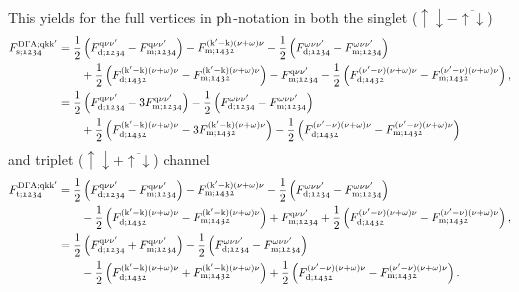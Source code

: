 \documentclass[main.tex]{subfiles}
\begin{document}
This yields for the full vertices in $\text{ph}$-notation in both the singlet ($\uparrow\downarrow-\overline{\uparrow\downarrow}$)
\begin{align}
\begin{split}
	F_{\text{s};\mathfrak{1234}}^{\text{D}\Gamma\text{A};\text{q}\text{k}\text{k}'}&=\frac12\left (F_{\text{d};\mathfrak{1234}}^{\text{q}\nu\nu'}-F_{\text{m};\mathfrak{1234}}^{\text{q}\nu\nu'}\right )-F_{\text{m};\mathfrak{1432}}^{(\text{k}'-\text{k})(\nu+\omega)\nu}-\frac12\left (F_{\text{d};\mathfrak{1234}}^{\omega\nu\nu'}-F_{\text{m};\mathfrak{1234}}^{\omega\nu\nu'}\right )\\
	&\qquad+\frac12\left (F_{\text{d};\mathfrak{1432}}^{(\text{k}'-\text{k})(\nu+\omega)\nu}-F_{\text{m};\mathfrak{1432}}^{(\text{k}'-\text{k})(\nu+\omega)\nu}\right )-F_{\text{m};\mathfrak{1234}}^{\text{q}\nu\nu'}-\frac12\left (F_{\text{d};\mathfrak{1432}}^{(\nu'-\nu)(\nu+\omega)\nu}-F_{\text{m};\mathfrak{1432}}^{(\nu'-\nu)(\nu+\omega)\nu}\right ),\\
	&=\frac12\left (F_{\text{d};\mathfrak{1234}}^{\text{q}\nu\nu'}-3F_{\text{m};\mathfrak{1234}}^{\text{q}\nu\nu'}\right )-\frac12\left (F_{\text{d};\mathfrak{1234}}^{\omega\nu\nu'}-F_{\text{m};\mathfrak{1234}}^{\omega\nu\nu'}\right )\\
	&\qquad+\frac12\left (F_{\text{d};\mathfrak{1432}}^{(\text{k}'-\text{k})(\nu+\omega)\nu}-3F_{\text{m};\mathfrak{1432}}^{(\text{k}'-\text{k})(\nu+\omega)\nu}\right )-\frac12\left (F_{\text{d};\mathfrak{1432}}^{(\nu'-\nu)(\nu+\omega)\nu}-F_{\text{m};\mathfrak{1432}}^{(\nu'-\nu)(\nu+\omega)\nu}\right )
\end{split}
\end{align}
and triplet ($\uparrow\downarrow+\overline{\uparrow\downarrow}$) channel
\begin{align}
\begin{split}
	F_{\text{t};\mathfrak{1234}}^{\text{D}\Gamma\text{A};\text{q}\text{k}\text{k}'}&=\frac12\left (F_{\text{d};\mathfrak{1234}}^{\text{q}\nu\nu'}-F_{\text{m};\mathfrak{1234}}^{\text{q}\nu\nu'}\right )-F_{\text{m};\mathfrak{1432}}^{(\text{k}'-\text{k})(\nu+\omega)\nu}-\frac12\left (F_{\text{d};\mathfrak{1234}}^{\omega\nu\nu'}-F_{\text{m};\mathfrak{1234}}^{\omega\nu\nu'}\right )\\
	&\qquad-\frac12\left (F_{\text{d};\mathfrak{1432}}^{(\text{k}'-\text{k})(\nu+\omega)\nu}-F_{\text{m};\mathfrak{1432}}^{(\text{k}'-\text{k})(\nu+\omega)\nu}\right )+F_{\text{m};\mathfrak{1234}}^{\text{q}\nu\nu'}+\frac12\left (F_{\text{d};\mathfrak{1432}}^{(\nu'-\nu)(\nu+\omega)\nu}-F_{\text{m};\mathfrak{1432}}^{(\nu'-\nu)(\nu+\omega)\nu}\right ),\\
	&=\frac12\left (F_{\text{d};\mathfrak{1234}}^{\text{q}\nu\nu'}+F_{\text{m};\mathfrak{1234}}^{\text{q}\nu\nu'}\right )-\frac12\left (F_{\text{d};\mathfrak{1234}}^{\omega\nu\nu'}-F_{\text{m};\mathfrak{1234}}^{\omega\nu\nu'}\right )\\
	&\qquad-\frac12\left (F_{\text{d};\mathfrak{1432}}^{(\text{k}'-\text{k})(\nu+\omega)\nu}+F_{\text{m};\mathfrak{1432}}^{(\text{k}'-\text{k})(\nu+\omega)\nu}\right )+\frac12\left (F_{\text{d};\mathfrak{1432}}^{(\nu'-\nu)(\nu+\omega)\nu}-F_{\text{m};\mathfrak{1432}}^{(\nu'-\nu)(\nu+\omega)\nu}\right ).
\end{split}
\end{align}
\end{document}
